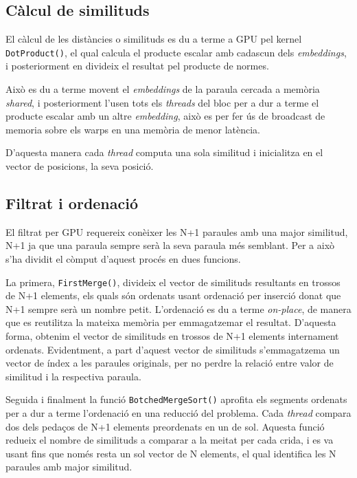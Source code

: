 \documentclass[catalan,10pt,a4paper]{article}
\begin{document}
\subsection*{Càlcul de similituds}
El càlcul de les distàncies o similituds es du a terme a GPU pel kernel \verb|DotProduct()|, el qual calcula el producte escalar amb cadascun dels \textit{embeddings}, i posteriorment en divideix el resultat pel producte de normes.

Això es du a terme movent el \textit{embeddings} de la paraula cercada a memòria \textit{shared}, i posteriorment l'usen tots els \textit{threads} del bloc per a dur a terme el producte escalar amb un altre \textit{embedding}, això es per fer ús de broadcast de memoria sobre els warps en una memòria de menor latència.

D'aquesta manera cada \textit{thread} computa una sola similitud i inicialitza en el vector de posicions, la seva posició.

\subsection*{Filtrat i ordenació}
El filtrat per GPU requereix conèixer les N+1 paraules amb una major similitud, N+1 ja que una paraula sempre serà la seva paraula més semblant. Per a això s'ha dividit el còmput d'aquest procés en dues funcions.

La primera, \verb|FirstMerge()|, divideix el vector de similituds resultants en trossos de N+1 elements, els quals són ordenats usant ordenació per inserció donat que N+1 sempre serà un nombre petit. L'ordenació es du a terme \textit{on-place}, de manera que es reutilitza la mateixa memòria per emmagatzemar el resultat.\newline
D'aquesta forma, obtenim el vector de similituds en trossos de N+1 elements internament ordenats. Evidentment, a part d'aquest vector de similituds s'emmagatzema un vector de índex a les paraules originals, per no perdre la relació entre valor de similitud i la respectiva paraula.

Seguida i finalment la funció \verb|BotchedMergeSort()| aprofita els segments ordenats per a dur a terme l'ordenació en una reducció del problema. Cada \textit{thread} compara dos dels pedaços de N+1 elements preordenats en un de sol.\newline
Aquesta funció redueix el nombre de similituds a comparar a la meitat per cada crida, i es va usant fins que només resta un sol vector de N elements, el qual identifica les N paraules amb major similitud.
\end{document}
